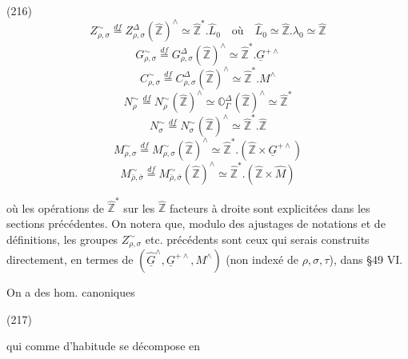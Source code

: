 (216)
$$ Z_{\rho,\sigma}^\sim \overset{df}{=} Z_{\rho,\sigma}^\Delta(\hat{\mathbb{Z}})^\wedge \simeq \hat{\mathbb{Z}}^* . \hat{L}_0 \quad \text{où} \quad \hat{L}_0 \simeq \hat{\mathbb{Z}} . \lambda_0 \simeq \hat{\mathbb{Z}} $$
$$ G_{\rho,\sigma}^\sim \overset{df}{=} G_{\rho,\sigma}^\Delta(\hat{\mathbb{Z}})^\wedge \simeq \hat{\mathbb{Z}}^* . \underline{G}^{+\wedge} $$
$$ C_{\rho,\sigma}^\sim \overset{df}{=} C_{\rho,\sigma}^\Delta(\hat{\mathbb{Z}})^\wedge \simeq \hat{\mathbb{Z}}^* . M^\wedge $$
$$ N_{\rho}^\sim \overset{df}{=} N_\rho^\sim(\hat{\mathbb{Z}})^\wedge \simeq \mathbb{O}_\Gamma^\Delta(\hat{\mathbb{Z}})^\wedge \simeq \hat{\mathbb{Z}}^* $$
$$ N_{\sigma}^\sim \overset{df}{=} N_{\sigma}^\sim(\hat{\mathbb{Z}})^\wedge \simeq \hat{\mathbb{Z}}^* . \hat{\mathbb{Z}} $$
$$ M_{\rho,\sigma}^\sim \overset{df}{=} M_{\rho,\sigma}^\sim(\hat{\mathbb{Z}})^\wedge \simeq \hat{\mathbb{Z}}^* . (\hat{\mathbb{Z}} \times \underline{G}^{+\wedge}) $$
$$ M_{\bar{\rho},\bar{\sigma}}^\sim \overset{df}{=} M_{\bar{\rho},\bar{\sigma}}^\sim(\hat{\mathbb{Z}})^\wedge \simeq \hat{\mathbb{Z}}^* . (\hat{\mathbb{Z}} \times \hat{M}) $$

où les opérations de $\hat{\mathbb{Z}}^*$ sur les $\hat{\mathbb{Z}}$ facteurs à droite sont explicitées dans les sections précédentes. On notera que, modulo des ajustages de notations et de définitions, les groupes $Z_{\rho,\sigma}^\sim$ etc. précédents sont ceux qui serais construits directement, en termes de $(\hat{\underline{G}}^\wedge, \underline{G}^{+\wedge}, M^\wedge)$ (non indexé de $\rho,\sigma,\tau$), dans §49 VI.

On a des hom. canoniques

(217)

qui comme d'habitude se décompose en

\newpage


